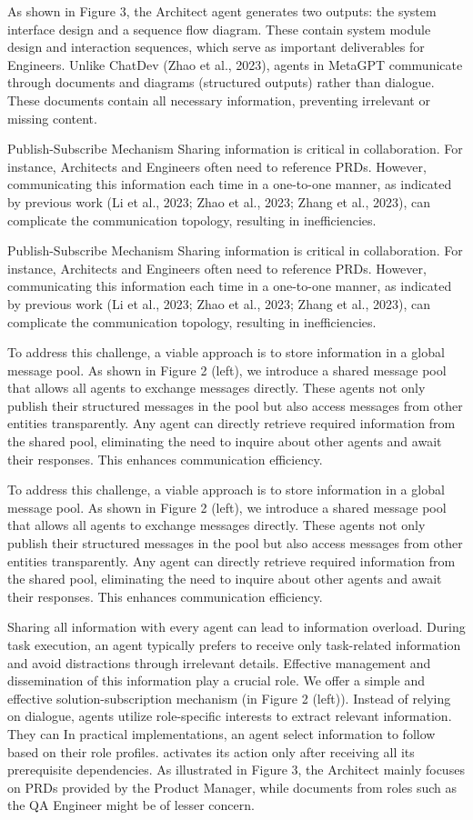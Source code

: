 \documentclass[12pt]{article}
\begin{document}
As shown in Figure 3, the Architect agent generates two outputs: the system interface design and a
sequence flow diagram. These contain system module design and interaction sequences, which serve
as important deliverables for Engineers. Unlike ChatDev (Zhao et al., 2023), agents in MetaGPT
communicate through documents and diagrams (structured outputs) rather than dialogue. These
documents contain all necessary information, preventing irrelevant or missing content.


Publish-Subscribe Mechanism Sharing information is critical in collaboration. For instance,
Architects and Engineers often need to reference PRDs. However, communicating this information
each time in a one-to-one manner, as indicated by previous work (Li et al., 2023; Zhao et al., 2023;
Zhang et al., 2023), can complicate the communication topology, resulting in inefficiencies.


Publish-Subscribe Mechanism Sharing information is critical in collaboration. For instance,
Architects and Engineers often need to reference PRDs. However, communicating this information
each time in a one-to-one manner, as indicated by previous work (Li et al., 2023; Zhao et al., 2023;
Zhang et al., 2023), can complicate the communication topology, resulting in inefficiencies.


To address this challenge, a viable approach is to store information in a global message pool. As
shown in Figure 2 (left), we introduce a shared message pool that allows all agents to exchange
messages directly. These agents not only publish their structured messages in the pool but also access
messages from other entities transparently. Any agent can directly retrieve required information
from the shared pool, eliminating the need to inquire about other agents and await their responses.
This enhances communication efficiency.


To address this challenge, a viable approach is to store information in a global message pool. As
shown in Figure 2 (left), we introduce a shared message pool that allows all agents to exchange
messages directly. These agents not only publish their structured messages in the pool but also access
messages from other entities transparently. Any agent can directly retrieve required information
from the shared pool, eliminating the need to inquire about other agents and await their responses.
This enhances communication efficiency.


Sharing all information with every agent can lead to information overload. During task execution,
an agent typically prefers to receive only task-related information and avoid distractions through
irrelevant details. Effective management and dissemination of this information play a crucial role.
We offer a simple and effective solution-subscription mechanism (in Figure 2 (left)). Instead of
relying on dialogue, agents utilize role-specific interests to extract relevant information. They can
In practical implementations, an agent
select information to follow based on their role profiles.
activates its action only after receiving all its prerequisite dependencies. As illustrated in Figure 3,
the Architect mainly focuses on PRDs provided by the Product Manager, while documents from
roles such as the QA Engineer might be of lesser concern.
\end{document}
